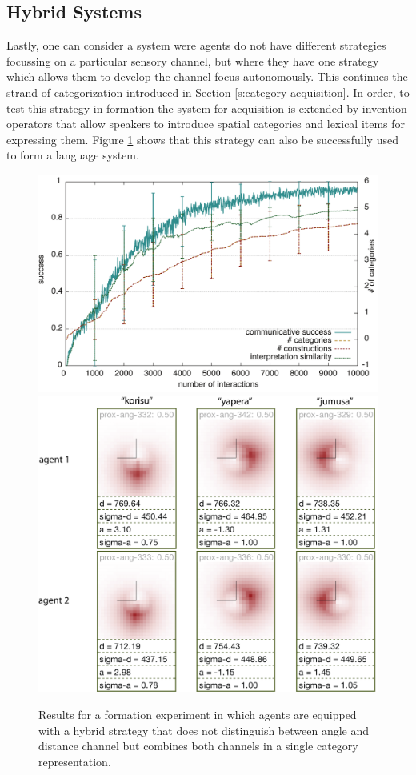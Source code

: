 \subsection{Hybrid Systems}
Lastly, one can consider a system were agents do not have different strategies 
focussing on a particular sensory channel, but where they have one strategy 
which allows them to develop the channel focus autonomously. 
This continues the strand of categorization introduced in
Section \ref{s:category-acquisition}. In order, to test this strategy in formation
the system for acquisition is extended by invention operators that allow
speakers to introduce spatial categories and lexical items for expressing them.
Figure \ref{f:proximal-angular+results} shows that this strategy can also be
successfully used to form a language system.
\begin{figure}
\begin{center}
\includegraphics[width=0.9\columnwidth]{figs/category-formation-proximal-angular-results+categories-1}
\includegraphics[width=0.8\columnwidth]{figs/category-formation-proximal-angular-results+categories-2.png}
\end{center}
\caption[Results formation of hybrid systems]{Results for a formation 
experiment in which agents are equipped with a hybrid
strategy that does not distinguish between angle and distance 
channel but combines both channels in a single 
category representation.}
\label{f:proximal-angular+results}
\end{figure}

